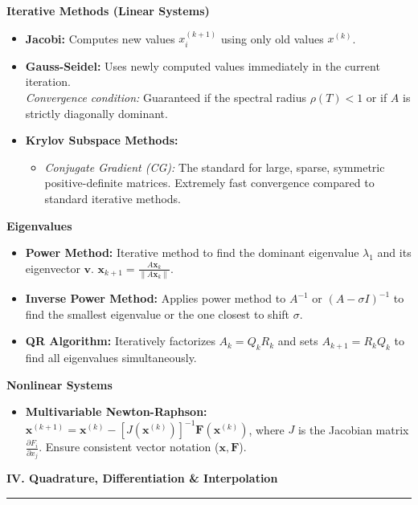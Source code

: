 \documentclass[10pt, landscape, twocolumn]{article}
\newcommand{\cheatsheetsection}[1]{
    \vspace{0.6em}
    {\color{themeblue}\large\bfseries #1} \par
    \vspace{-0.5em}
    {\color{themeblue}\rule{\linewidth}{1pt}} \par
    \vspace{0.2em}
}
\newcommand{\cheatsheetsubsection}[1]{
    \vspace{0.4em}
    {\color{themeblue}\normalsize\bfseries #1} \par
    \vspace{0.1em}
}
\begin{document}
\cheatsheetsubsection{Iterative Methods (Linear Systems)}
\begin{itemize}[leftmargin=*, nosep]
    \item \textbf{Jacobi:} Computes new values $x_i^{(k+1)}$ using only old values $x^{(k)}$.
    \item \textbf{Gauss-Seidel:} Uses newly computed values immediately in the current iteration. \\
    \textit{Convergence condition:} Guaranteed if the spectral radius $\rho(T) < 1$ or if $A$ is strictly diagonally dominant.
    \item \textbf{Krylov Subspace Methods:} 
    \begin{itemize}[leftmargin=*, nosep]
        \item \textit{Conjugate Gradient (CG):} The standard for large, sparse, symmetric positive-definite matrices. Extremely fast convergence compared to standard iterative methods.
    \end{itemize}
\end{itemize}

\cheatsheetsubsection{Eigenvalues}
\begin{itemize}[leftmargin=*, nosep]
    \item \textbf{Power Method:} Iterative method to find the dominant eigenvalue $\lambda_1$ and its eigenvector $\mathbf{v}$. 
    $\mathbf{x}_{k+1} = \frac{A \mathbf{x}_k}{\|A \mathbf{x}_k\|}$.
    \item \textbf{Inverse Power Method:} Applies power method to $A^{-1}$ or $(A - \sigma I)^{-1}$ to find the smallest eigenvalue or the one closest to shift $\sigma$.
    \item \textbf{QR Algorithm:} Iteratively factorizes $A_k = Q_k R_k$ and sets $A_{k+1} = R_k Q_k$ to find all eigenvalues simultaneously.
\end{itemize}

\cheatsheetsubsection{Nonlinear Systems}
\begin{itemize}[leftmargin=*, nosep]
    \item \textbf{Multivariable Newton-Raphson:} $\mathbf{x}^{(k+1)} = \mathbf{x}^{(k)} - [J(\mathbf{x}^{(k)})]^{-1} \mathbf{F}(\mathbf{x}^{(k)})$, where $J$ is the Jacobian matrix $\frac{\partial F_i}{\partial x_j}$. Ensure consistent vector notation ($\mathbf{x}, \mathbf{F}$).
\end{itemize}

\cheatsheetsection{IV. Quadrature, Differentiation \& Interpolation}
\end{document}

